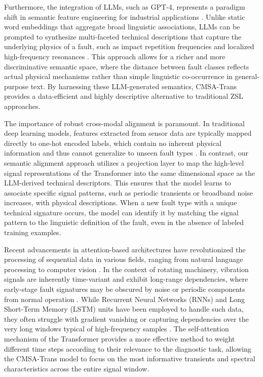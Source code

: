 Furthermore, the integration of LLMs, such as GPT-4, represents a paradigm shift in semantic feature engineering for industrial applications \cite{bubeck2023sparks}. Unlike static word embeddings that aggregate broad linguistic associations, LLMs can be prompted to synthesize multi-faceted technical descriptions that capture the underlying physics of a fault, such as impact repetition frequencies and localized high-frequency resonances \cite{brown2020language}. This approach allows for a richer and more discriminative semantic space, where the distance between fault classes reflects actual physical mechanisms rather than simple linguistic co-occurrence in general-purpose text. By harnessing these LLM-generated semantics, CMSA-Trans provides a data-efficient and highly descriptive alternative to traditional ZSL approaches.

The importance of robust cross-modal alignment is paramount. In traditional deep learning models, features extracted from sensor data are typically mapped directly to one-hot encoded labels, which contain no inherent physical information and thus cannot generalize to unseen fault types \cite{goodfellow2016deep, lecun2015deep}. In contrast, our semantic alignment approach utilizes a projection layer to map the high-level signal representations of the Transformer into the same dimensional space as the LLM-derived technical descriptors. This ensures that the model learns to associate specific signal patterns, such as periodic transients or broadband noise increases, with physical descriptions. When a new fault type with a unique technical signature occurs, the model can identify it by matching the signal pattern to the linguistic definition of the fault, even in the absence of labeled training examples.

Recent advancements in attention-based architectures have revolutionized the processing of sequential data in various fields, ranging from natural language processing to computer vision \cite{devlin2018bert, dosovitskiy2020image}. In the context of rotating machinery, vibration signals are inherently time-variant and exhibit long-range dependencies, where early-stage fault signatures may be obscured by noise or periodic components from normal operation \cite{zhang2021attention}. While Recurrent Neural Networks (RNNs) and Long Short-Term Memory (LSTM) units have been employed to handle such data, they often struggle with gradient vanishing or capturing dependencies over the very long windows typical of high-frequency samples \cite{hochreiter1997long}. The self-attention mechanism of the Transformer provides a more effective method to weight different time steps according to their relevance to the diagnostic task, allowing the CMSA-Trans model to focus on the most informative transients and spectral characteristics across the entire signal window.


